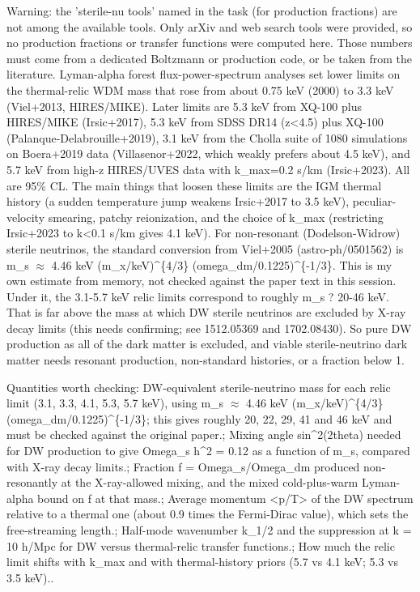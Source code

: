 \documentclass[11pt,a4paper]{article}
\begin{document}
Warning: the 'sterile-nu tools' named in the task (for production fractions) are not among the available tools. Only arXiv and web search tools were provided, so no production fractions or transfer functions were computed here. Those numbers must come from a dedicated Boltzmann or production code, or be taken from the literature. Lyman-alpha forest flux-power-spectrum analyses set lower limits on the thermal-relic WDM mass that rose from about 0.75 keV (2000) to 3.3 keV (Viel+2013, HIRES/MIKE). Later limits are 5.3 keV from XQ-100 plus HIRES/MIKE (Irsic+2017), 5.3 keV from SDSS DR14 (z\textless{}4.5) plus XQ-100 (Palanque-Delabrouille+2019), 3.1 keV from the Cholla suite of 1080 simulations on Boera+2019 data (Villasenor+2022, which weakly prefers about 4.5 keV), and 5.7 keV from high-z HIRES/UVES data with k\_max=0.2 s/km (Irsic+2023). All are 95\% CL. The main things that loosen these limits are the IGM thermal history (a sudden temperature jump weakens Irsic+2017 to 3.5 keV), peculiar-velocity smearing, patchy reionization, and the choice of k\_max (restricting Irsic+2023 to k\textless{}0.1 s/km gives 4.1 keV). For non-resonant (Dodelson-Widrow) sterile neutrinos, the standard conversion from Viel+2005 (astro-ph/0501562) is m\_s $\approx$ 4.46 keV (m\_x/keV)\textasciicircum{}\{4/3\} (omega\_dm/0.1225)\textasciicircum{}\{-1/3\}. This is my own estimate from memory, not checked against the paper text in this session. Under it, the 3.1-5.7 keV relic limits correspond to roughly m\_s ? 20-46 keV. That is far above the mass at which DW sterile neutrinos are excluded by X-ray decay limits (this needs confirming; see 1512.05369 and 1702.08430). So pure DW production as all of the dark matter is excluded, and viable sterile-neutrino dark matter needs resonant production, non-standard histories, or a fraction below 1.

Quantities worth checking: DW-equivalent sterile-neutrino mass for each relic limit (3.1, 3.3, 4.1, 5.3, 5.7 keV), using m\_s $\approx$ 4.46 keV (m\_x/keV)\textasciicircum{}\{4/3\} (omega\_dm/0.1225)\textasciicircum{}\{-1/3\}; this gives roughly 20, 22, 29, 41 and 46 keV and must be checked against the original paper.; Mixing angle sin\textasciicircum{}2(2theta) needed for DW production to give Omega\_s h\textasciicircum{}2 = 0.12 as a function of m\_s, compared with X-ray decay limits.; Fraction f = Omega\_s/Omega\_dm produced non-resonantly at the X-ray-allowed mixing, and the mixed cold-plus-warm Lyman-alpha bound on f at that mass.; Average momentum \textless{}p/T\textgreater{} of the DW spectrum relative to a thermal one (about 0.9 times the Fermi-Dirac value), which sets the free-streaming length.; Half-mode wavenumber k\_1/2 and the suppression at k = 10 h/Mpc for DW versus thermal-relic transfer functions.; How much the relic limit shifts with k\_max and with thermal-history priors (5.7 vs 4.1 keV; 5.3 vs 3.5 keV)..
\end{document}
